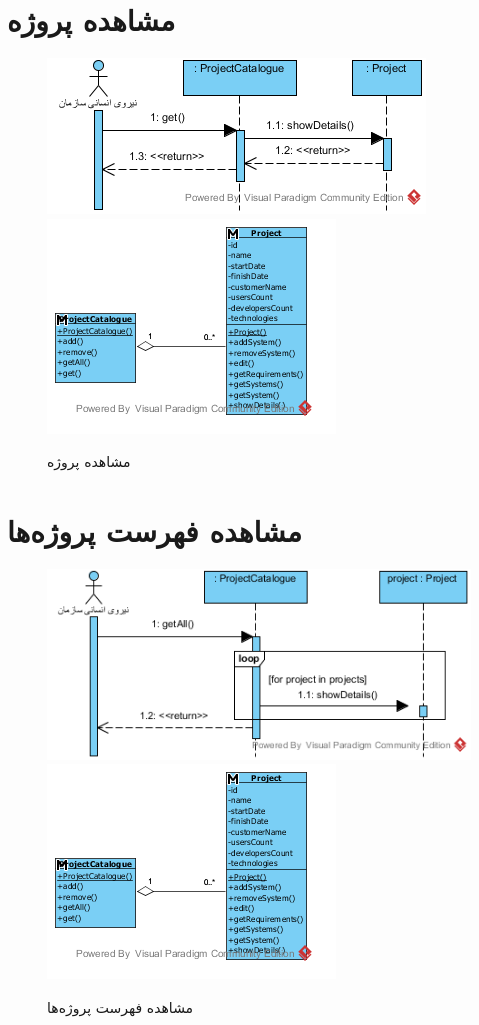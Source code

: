 \section{مشاهده پروژه}
\begin{figure}[H]
	\centering
	\includegraphics[scale=0.9]{img/sequence-analysis/ViewProject}
	\includegraphics[scale=0.9]{img/sequence-analysis/ViewProjectC}
	\caption{مشاهده پروژه}
\end{figure}


\section{مشاهده فهرست پروژه‌ها}
\begin{figure}[H]
	\centering
	\includegraphics[scale=0.9]{img/sequence-analysis/ViewListOfProjects}
	\includegraphics[scale=0.9]{img/sequence-analysis/ViewListOfProjectsC}
	\caption{مشاهده فهرست پروژه‌ها}
\end{figure}


